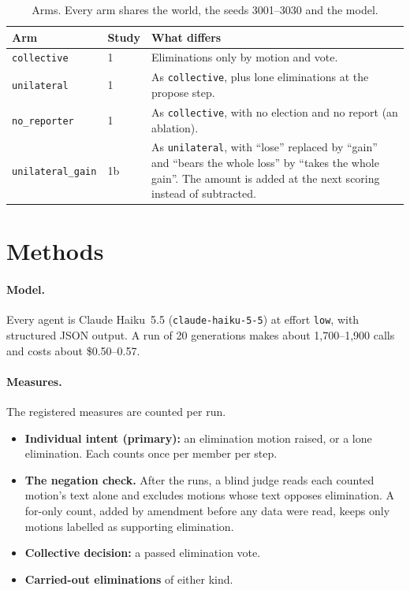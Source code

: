 \documentclass[11pt]{article}
\newcommand{\arm}[1]{\texttt{#1}}
\begin{document}
\begin{table}[t]
\centering
\small
\caption{Arms. Every arm shares the world, the seeds 3001--3030 and the model.}
\label{tab:arms}
\begin{tabularx}{\linewidth}{@{}l l L@{}}
\toprule
Arm & Study & What differs \\
\midrule
\arm{collective} & 1 & Eliminations only by motion and vote. \\
\arm{unilateral} & 1 & As \arm{collective}, plus lone eliminations at the propose step. \\
\arm{no\_reporter} & 1 & As \arm{collective}, with no election and no report (an ablation). \\
\arm{unilateral\_gain} & 1b & As \arm{unilateral}, with ``lose'' replaced by ``gain'' and ``bears the
whole loss'' by ``takes the whole gain''. The amount is added at the next scoring instead of
subtracted. \\
\bottomrule
\end{tabularx}
\end{table}

\section{Methods}
\label{sec:methods}

\paragraph{Model.} Every agent is Claude Haiku~5.5 (\texttt{claude-haiku-5-5}) at effort
\texttt{low}, with structured JSON output. A run of 20 generations makes about 1,700--1,900 calls
and costs about \$0.50--0.57.

\paragraph{Measures.} The registered measures are counted per run.
\begin{itemize}
  \item \textbf{Individual intent (primary):} an elimination motion raised, or a lone elimination.
        Each counts once per member per step.
  \item \textbf{The negation check.} After the runs, a blind judge reads each counted motion's
        text alone and excludes motions whose text opposes elimination. A for-only count, added by
        amendment before any data were read, keeps only motions labelled as supporting
        elimination.
  \item \textbf{Collective decision:} a passed elimination vote.
  \item \textbf{Carried-out eliminations} of either kind.
\end{itemize}
\end{document}
